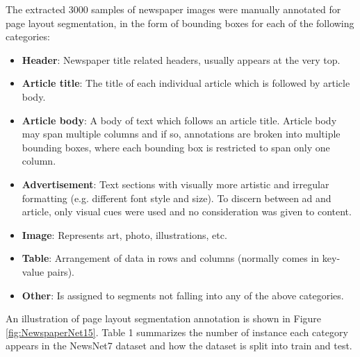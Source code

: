 \documentclass[letterpaper]{article} %
\begin{document}
The extracted 3000 samples of newspaper images were manually annotated for page layout segmentation, in the form of bounding boxes for each of the following categories:
\begin{itemize}
    \item \textbf{Header}: Newspaper title related headers, usually appears at the very top.
    \item \textbf{Article title}: The title of each individual article which is followed by article body. 
    \item \textbf{Article body}: A body of text which follows an article title. Article body may span multiple columns and if so, annotations are broken into multiple bounding boxes, where each bounding box is restricted to span only one column.
    \item \textbf{Advertisement}: Text sections with visually more artistic and irregular formatting (e.g. different font style and size). To discern between ad and article, only visual cues were used and no consideration was given to content.
    \item \textbf{Image}: Represents art, photo, illustrations, etc.
    \item \textbf{Table}: Arrangement of data in rows and columns (normally comes in key-value pairs). 
    \item \textbf{Other}: Is assigned to segments not falling into any of the above categories.
\end{itemize}

An illustration of page layout segmentation annotation is shown in Figure \ref{fig:NewspaperNet15}.
Table 1 summarizes the number of instance each category appears in the NewsNet7 dataset and how the dataset is split into train and test.

\end{document}
